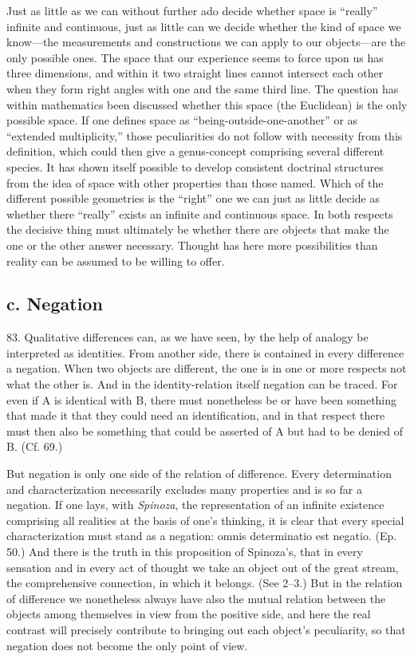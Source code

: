 \documentclass[12pt,a4paper]{book}
\newcommand{\opage}[1]{\marginnote{\footnotesize\textit{[#1]}}}
\begin{document}
Just as little as we can without further ado decide whether space is
``really'' infinite and continuous, just as little can we decide whether the
kind of space we know---the measurements and constructions we can apply to
our objects---are the only possible ones. The space that our experience seems
to force upon us has three dimensions, and within it two straight lines
cannot intersect each other when they form right angles with one and the same
third line. The question has within mathematics been discussed whether this
space (the Euclidean) is the only possible space. If one defines space as
``being-outside-one-another'' or as ``extended multiplicity,'' those
peculiarities do not follow with necessity from this definition, which could
then give a genus-concept comprising several different species. It has shown
itself possible to develop consistent doctrinal structures from the idea of
space with other properties than those named. Which of the different possible
geometries is the ``right'' one we can just as little decide as whether there
``really'' exists an infinite and continuous space. In both respects the
decisive thing must ultimately be whether there are objects that make the one
or the other answer necessary. Thought has here more possibilities than
reality can be assumed to be willing to offer.

\subsection*{c. Negation}

83. Qualitative differences can, as we have seen, by the help of analogy be
interpreted as identities. From another side, there is contained in every
difference a negation. When two objects are different, the one is in one or
more respects not what the other is. And in the identity-relation itself
\opage{202}negation can be traced. For even if A is identical with B, there must
nonetheless be or have been something that made it that they could need an
identification, and in that respect there must then also be something that
could be asserted of A but had to be denied of B. (Cf. 69.)

But negation is only one side of the relation of difference. Every
determination and characterization necessarily excludes many properties and
is so far a negation. If one lays, with \emph{Spinoza}, the representation of
an infinite existence comprising all realities at the basis of one's
thinking, it is clear that every special characterization must stand as a
negation: omnis determinatio est negatio. (Ep. 50.) And there is the truth in
this proposition of Spinoza's, that in every sensation and in every act of
thought we take an object out of the great stream, the comprehensive
connection, in which it belongs. (See 2--3.) But in the relation of
difference we nonetheless always have also the mutual relation between the
objects among themselves in view from the positive side, and here the real
contrast will precisely contribute to bringing out each object's peculiarity,
so that negation does not become the only point of view.
\end{document}
